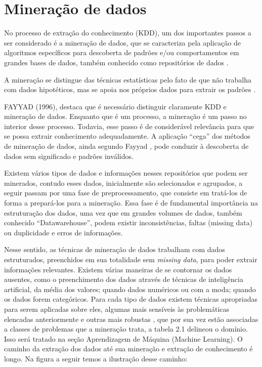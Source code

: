 
\pagebreak

\section{Mineração de dados}

No processo de extração do conhecimento (KDD), um dos importantes passos a ser considerado é a mineração de dados, que se caracteriza pela aplicação de algoritmos 
específicos para descoberta de padrões e/ou comportamentos em grandes bases de dados, também conhecido como repositórios de dados \cite{FayyadUeoutros}.

A mineração se distingue das técnicas estatísticas pelo fato de que  não trabalha com dados hipotéticos, mas se apoia nos próprios dados para extrair os padrões \cite{CASTANHEIRA, 2008}. 

FAYYAD (1996), destaca que é necessário distinguir claramente KDD e mineração de dados. Enquanto que é um processo, a mineração é um passo no interior desse processo. 
Todavia, esse passo é de considerável relevância para que se possa extrair conhecimento adequadamente. 
A aplicação “cega” dos métodos de mineração de dados, ainda segundo Fayyad \cite{FayyadUeoutros}, pode conduzir à descoberta de dados sem significado e padrões inválidos. 

Existem vários tipos de dados e informações nesses repositórios que podem ser minerados, contudo esses dados, inicialmente são selecionados e agrupados, a seguir passam por 
uma fase de preprocessamento, que consiste em tratá-los de forma a prepará-los para a mineração. Essa fase é de 
fundamental importância na estruturação dos dados, uma vez que em grandes volumes de dados, também conhecido ``Datawarehouse'', podem existir inconsistências, faltas (missing data) ou 
duplicidade e erros de informações.

Nesse sentido, as técnicas de mineração de dados trabalham com dados estruturados, preenchidos em sua totalidade sem \textit{missing data}, para poder extrair informações relevantes.
Existem várias maneiras de se contornar os dados ausentes, como o preenchimento dos dados através de técnicas de inteligência artificial, da média dos valores; quando dados numéricos 
ou com a moda; quando os dados forem categóricos. Para cada tipo de dados existem técnicas apropriadas para serem aplicadas sobre eles, algumas mais sensíveis às problemáticas elencadas anteriormente
e outras mais robustas \cite{DataMining2}, que por sua vez estão associadas a classes de problemas que a mineração trata, a tabela 2.1 delineou o domínio.
Isso será tratado na seção Aprendizagem de Máquina (Machine Learning).
O caminho da extração dos dados até sua mineração e extração de conhecimento é longo.
Na figura a seguir temos a ilustração desse caminho:

